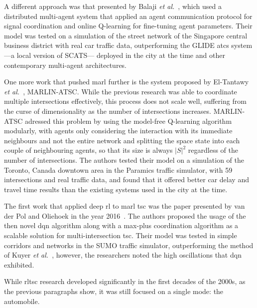 A different approach was that presented by Balaji \textit{et al.}~\cite{Balaji2010}, which used a distributed multi-agent system that applied an agent communication protocol for signal coordination and online Q-learning for fine-tuning agent parameters. Their model was tested on a simulation of the street network of the Singapore central business district with real car traffic data, outperforming the GLIDE \gls{atcs} system —a local version of SCATS— deployed in the city at the time and other contemporary multi-agent architectures.

One more work that pushed \gls{marl} further is the system proposed by El-Tantawy \textit{et al.}~\cite{El-Tantawy2013}, MARLIN-ATSC. While the previous research was able to coordinate multiple intersections effectively, this process does not scale well, suffering from the curse of dimensionality as the number of intersections increases. MARLIN-ATSC adressed this problem by using the model-free Q-learning algorithm modularly, with agents only considering the interaction with its immediate neighbours and not the entire network and splitting the space state into each couple of neighbouring agents, so that its size is always $|{S}|^2$ regardless of the number of intersections. The authors tested their model on a simulation of the Toronto, Canada downtown area in the Paramics traffic simulator, with 59 intersections and real traffic data, and found that it offered better car delay and travel time results than the existing systems used in the city at the time.

The first work that applied deep \gls{rl} to \gls{marl} \gls{tsc} was the paper presented by van der Pol and Oliehoek in the year 2016~\cite{vanderPol2016}. The authors proposed the usage of the then novel \gls{dqn} algorithm along with a max-plus coordination algorithm as a scalable solution for multi-intersection \gls{tsc}. Their model was tested in simple corridors and networks in the SUMO traffic simulator, outperforming the method of Kuyer \textit{et al.}~\cite{Kuyer2008}, however, the researchers noted the high oscillations that \gls{dqn} exhibited.

\medskip

\noindent While \gls{rltsc} research developed significantly in the first decades of the 2000s, as the previous paragraphs show, it was still focused on a single mode: the automobile.

